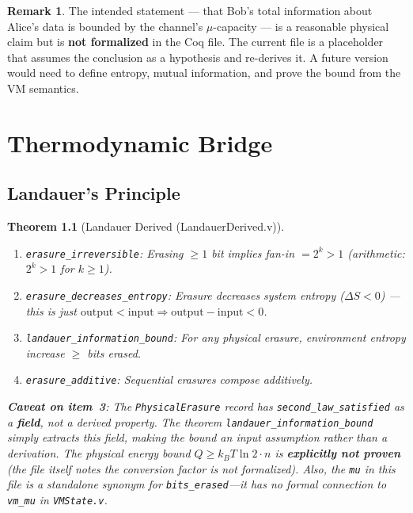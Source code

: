 \documentclass[11pt, a4paper]{report}
\theoremstyle{definition}
\newtheorem{remark}{Remark}[chapter]
\theoremstyle{plain}
\newtheorem{theorem}{Theorem}[chapter]
\begin{document}
\begin{remark}
The intended statement — that Bob's total information about Alice's data is bounded by the channel's $\mu$-capacity — is a reasonable physical claim but is \textbf{not formalized} in the Coq file. The current file is a placeholder that assumes the conclusion as a hypothesis and re-derives it. A future version would need to define entropy, mutual information, and prove the bound from the VM semantics.
\end{remark}

\chapter{Thermodynamic Bridge}

\section{Landauer's Principle}

\begin{theorem}[Landauer Derived {\normalfont (LandauerDerived.v)}]
\leavevmode
\begin{enumerate}
    \item \texttt{erasure\_irreversible}: Erasing $\ge 1$ bit implies fan-in $= 2^k > 1$ (arithmetic: $2^k > 1$ for $k \ge 1$).
    \item \texttt{erasure\_decreases\_entropy}: Erasure decreases system entropy ($\Delta S < 0$) --- this is just $\mathrm{output} < \mathrm{input} \Rightarrow \mathrm{output} - \mathrm{input} < 0$.
    \item \texttt{landauer\_information\_bound}: For any physical erasure, environment entropy increase $\ge$ bits erased.
    \item \texttt{erasure\_additive}: Sequential erasures compose additively.
\end{enumerate}

\textbf{Caveat on item~3}: The \texttt{PhysicalErasure} record has \texttt{second\_law\_satisfied} as a \textbf{field}, not a derived property. The theorem \texttt{landauer\_information\_bound} simply extracts this field, making the bound an \emph{input assumption} rather than a derivation. The physical energy bound $Q \ge k_B T \ln 2 \cdot n$ is \textbf{explicitly not proven} (the file itself notes the conversion factor is not formalized). Also, the \texttt{mu} in this file is a standalone synonym for \texttt{bits\_erased}---it has no formal connection to \texttt{vm\_mu} in \texttt{VMState.v}.
\end{theorem}
\end{document}
